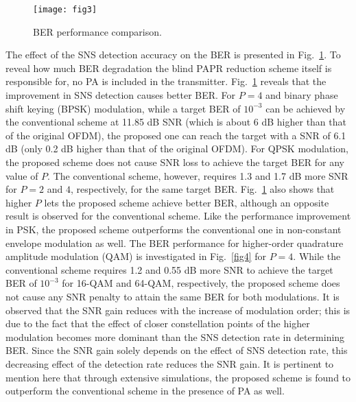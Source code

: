 \documentclass[journal,comsoc]{IEEEtran}
\begin{document}
      \begin{figure}[!t]
\centering
\texttt{[image: fig3]}
\caption{BER performance comparison.}

\label{fig3}
\end{figure}
   
   The effect of the SNS detection accuracy on the BER is presented in Fig.~\ref{fig3}. To reveal how much BER degradation the blind PAPR reduction scheme itself is responsible for, no PA is included in the transmitter. Fig.~\ref{fig3} reveals that the improvement in SNS detection causes better BER. For $P=4$ and binary phase shift keying (BPSK) modulation, while a target BER of $10^{-3}$ can be achieved by the conventional scheme at 11.85 dB SNR (which is about 6 dB higher than that of the original OFDM), the proposed one can reach the target with a SNR of 6.1 dB (only 0.2 dB higher than that of the original OFDM). For QPSK modulation, the proposed scheme does not cause SNR loss to achieve the target BER for any value of $P$. The conventional scheme, however, requires 1.3 and 1.7 dB more SNR for $P=2$ and $4$, respectively, for the same target BER. Fig.~\ref{fig3} also shows that higher $P$ lets the proposed scheme achieve better BER, although an opposite result is observed for the conventional scheme. Like the performance improvement in PSK, the proposed scheme outperforms the conventional one in non-constant envelope modulation as well. The BER performance for higher-order quadrature amplitude modulation (QAM) is investigated in Fig.~\ref{fig4} for $P=4$. While the conventional scheme requires 1.2 and 0.55 dB more SNR to achieve the target BER of $10^{-3}$ for 16-QAM and 64-QAM, respectively, the proposed scheme does not cause any SNR penalty to attain the same BER for both modulations. It is observed that the SNR gain reduces with the increase of modulation order; this is due to the fact that the effect of closer constellation points of the higher modulation becomes more dominant than the SNS detection rate in determining BER. Since the SNR gain solely depends on the effect of SNS detection rate, this decreasing effect of the detection rate reduces the SNR gain. It is pertinent to mention here that through extensive simulations, the proposed scheme is found to outperform the conventional scheme in the presence of PA as well. 
\end{document}
